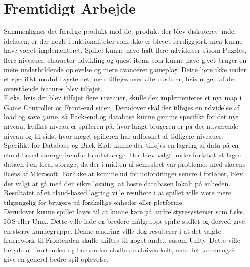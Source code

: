 \section{Fremtidigt Arbejde}
Sammenlignes det færdige produkt med det produkt der blev diskuteret under idefasen, er der nogle funktionaliteter som ikke er blevet færdiggjort, men kunne have været implementeret. Spillet kunne have haft flere udvidelser såsom Puzzles, flere niveauer, character udvikling og quest items som kunne have givet bruger en mere underholdende oplevelse og mere avanceret gameplay. Dette høre ikke under et specifikt modul i systemet, men tilføjes over alle moduler, hvis nogen af de overstående features blev tilføjet. \\

F.eks. hvis der blev tilføjet flere niveauer, skulle der implementeres et nyt map i Game Controller og Front-end siden. Derudover skal der tilføjes en udvidelse af load og save game, så Back-end og database kunne gemme specifikt for det nye niveau, hvilket niveau er spilleren på, hvor langt brugeren er på det nuværende niveau og til sidst hvor meget spilleren har udforsket af tidligere niveauer.\\

Specifikt for Database og Back-End, kunne der tilføjes en lagring af data på en cloud-based storage fremfor lokal storage. Der blev valgt under forløbet at lagre dataen i en local storage, da der i midten af semestret var problemer med skolens licens af Microsoft. For ikke at komme ud for udfordringer senere i forløbet, blev der valgt at gå med den sikre løsning, at hoste databasen lokalt på enheden. Resultatet af et cloud-based lagring ville resultere i at spillet ville være mere tilgængelig for brugere på forskellige enheder eller platforme. \\

Derudover kunne spillet laves til at kunne køre på andre styresystemer som f.eks. IOS eller Unix. Dette ville lade en bredere målgruppe spille spillet og derved give en større kundegruppe. Denne ændring ville dog resulterer i at det valgte framework til Frontenden skulle skiftes til noget andet, såsom Unity. Dette ville betyde at frontenden og backenden skulle omskrives helt, men det kunne også give en generel bedre spil oplevelse.


